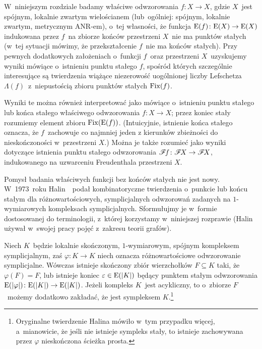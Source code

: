 W~niniejszym rozdziale badamy właściwe odwzorowania $f\colon X\to X$, gdzie $X$~jest spójnym, lokalnie zwartym wielościanem (lub~ogólniej: spójnym, lokalnie zwartym, metrycznym ANR-em), o~tej własności, że funkcja $\mathrm{E}(f)\colon \mathrm{E}(X)\to \mathrm{E}(X)$ indukowana przez $f$~na zbiorze końców przestrzeni $X$~nie ma punktów stałych (w~tej sytuacji mówimy, że przekształcenie $f$~nie ma końców stałych). Przy pewnych dodatkowych założeniach o~funkcji $f$~oraz przestrzeni $X$~uzyskujemy wyniki mówiące o~istnieniu punktu stałego $f$, spośród których szczególnie interesujące są twierdzenia wiążące niezerowość uogólnionej liczby Lefschetza $\Lambda(f)$~z~niepustością zbioru punktów stałych $\operatorname{Fix}(f)$.

Wyniki te można również interpretować jako mówiące o~istnieniu punktu stałego lub końca stałego właściwego odwzorowania $f\colon X\to X$; przez koniec stały rozumiemy element zbioru $\operatorname{Fix}(\mathrm{E}(f))$. (Intuicyjnie, istnienie końca stałego oznacza, że $f$~zachowuje co najmniej jeden z kierunków zbieżności do nieskończoności w~przestrzeni $X$.) Można je także rozumieć jako wyniki dotyczące istnienia punktu stałego odwzorowania $\mathscr{F}\! f\colon \mathscr{F}\! X\to \mathscr{F}\! X$, indukowanego na uzwarceniu Freudenthala przestrzeni $X$.

Pomysł badania właściwych funkcji bez końców stałych nie jest nowy. W~1973~roku Halin~\cite{Halin73}~podał kombinatoryczne twierdzenia o~punkcie lub końcu stałym dla różnowartościowych, symplicjalnych odwzorowań zadanych na \mbox{$1$-wymiarowych} kompleksach symplicjalnych. Sformułujmy je w~formie dostosowanej do terminologii, z~której korzystamy w~niniejszej rozprawie (Halin używał w~swojej pracy pojęć z~zakresu teorii grafów).
\setcounter{tw}{0}
\begin{tw}\label{tw-halina_o_drzewie}
Niech $K$~będzie lokalnie skończonym, \mbox{$1$-wymiarowym}, spójnym kompleksem symplicjalnym, zaś $\varphi\colon K\to K$ niech oznacza różnowartościowe odwzorowanie symplicjalne. Wówczas istnieje skończony zbiór wierzchołków $F\subseteq K$ taki, że $\varphi(F)=F$, lub istnieje koniec $\varepsilon\in\mathrm{E}(|K|)$ będący punktem stałym odwzorowania $\mathrm{E}(|\varphi|)\colon \mathrm{E}(|K|)\to \mathrm{E}(|K|)$. Jeżeli kompleks $K$~jest acykliczny, to o~zbiorze $F$~możemy dodatkowo zakładać, że jest sympleksem $K$.\footnote{Oryginalne twierdzenie Halina mówiło w~tym przypadku więcej, a~mianowicie, że jeśli nie istnieje sympleks stały, to istnieje zachowywana przez $\varphi$ nieskończona ścieżka prosta.}
\end{tw}

